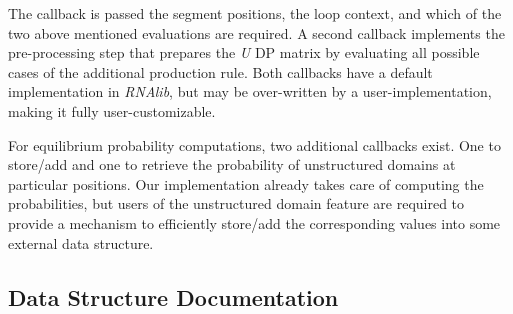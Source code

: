 The callback is passed the segment positions, the loop context, and which of the two above mentioned evaluations are required. A second callback implements the pre-\/processing step that prepares the {\itshape U} DP matrix by evaluating all possible cases of the additional production rule. Both callbacks have a default implementation in {\itshape R\+N\+Alib}, but may be over-\/written by a user-\/implementation, making it fully user-\/customizable.

For equilibrium probability computations, two additional callbacks exist. One to store/add and one to retrieve the probability of unstructured domains at particular positions. Our implementation already takes care of computing the probabilities, but users of the unstructured domain feature are required to provide a mechanism to efficiently store/add the corresponding values into some external data structure. 

\subsection{Data Structure Documentation}
\label{structvrna__unstructured__domain__s}
